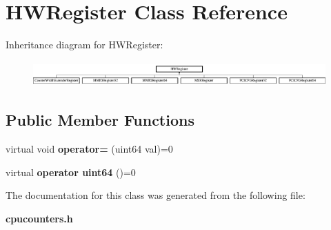 \section{H\+W\+Register Class Reference}
\label{classHWRegister}
Inheritance diagram for H\+W\+Register\+:\begin{figure}[H]
\begin{center}
\leavevmode
\includegraphics[height=0.972222cm]{classHWRegister}
\end{center}
\end{figure}
\subsection*{Public Member Functions}
\begin{DoxyCompactItemize}
\item 
\mbox{\label{classHWRegister_a7fe5bbe5747454e880bac6851d7cd6f2}} 
virtual void {\bfseries operator=} (uint64 val)=0
\item 
\mbox{\label{classHWRegister_a15a9cbd055e1cefcb00c1775987e02c7}} 
virtual {\bfseries operator uint64} ()=0
\end{DoxyCompactItemize}


The documentation for this class was generated from the following file\+:\begin{DoxyCompactItemize}
\item 
\textbf{ cpucounters.\+h}\end{DoxyCompactItemize}
